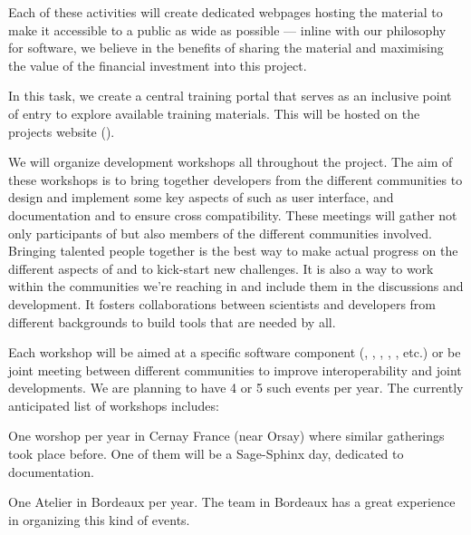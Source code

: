 \begin{workpackage}
\begin{tasklist}
\begin{task}[title=Training and training portal,
id=training-portal,lead=PS,PM=1,wphases=0-1]
Each of these activities will create dedicated webpages hosting the
material to make it accessible to a public as wide as possible ---
inline with our philosophy for software, we believe in the benefits of
sharing the material and maximising the value of the financial
investment into this project.

In this task, we create a central \TheProject training portal that
serves as an inclusive point of entry to explore available training
materials. This will be hosted on the projects website ().
\end{task}

\begin{task}[title=Community Building: Development Workshops, lead=PS,PM=24, partners={UB,UK,SR,SA,USH}, id=devel-workshops, wphases=0-48]

  We will organize development workshops all throughout the
  project. The aim of these workshops is to bring together developers
  from the different communities to design and implement some key
  aspects of \TheProject such as user interface, and documentation and
  to ensure cross compatibility. These meetings will gather not only
  participants of \TheProject but also members of the different
  communities involved. Bringing talented people together is the best
  way to make actual progress on the different aspects of \TheProject
  and to kick-start new challenges. It is also a way to work within
  the communities we're reaching in and include them in the discussions
  and development. It fosters collaborations between scientists and
  developers from different backgrounds to build tools that are needed
  by all.

  Each workshop will be aimed at a specific software component (\Sage,
  \GAP, \SMC, \IPython, \Singular, etc.) or be joint meeting between
  different communities to improve interoperability and joint
  developments. We are planning to have 4 or 5 such events per
  year. The currently anticipated list of workshops includes:

\begin{compactitem}
\item One \Sage worshop per year in Cernay France (near Orsay) where
  similar gatherings took place before. One of them will be a
  Sage-Sphinx day, dedicated to documentation.

\item One Atelier \Pari in Bordeaux per year. The team in Bordeaux has
  a great experience in organizing this kind of \Pari events.


\end{compactitem}
\end{task}
\end{tasklist}
\end{workpackage}
